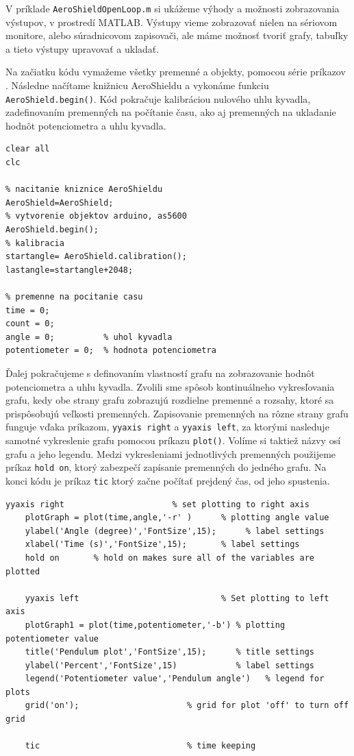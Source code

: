 V príklade \verb|AeroShieldOpenLoop.m| si ukážeme výhody a možnosti zobrazovania výstupov, v prostredí MATLAB. Výstupy vieme zobrazovať nielen na sériovom monitore, alebo súradnicovom zapisovači, ale máme možnosť tvoriť grafy, tabuľky a tieto výstupy upravovať a ukladať. 

Na začiatku kódu vymažeme všetky premenné a objekty, pomocou série príkazov . Následne načítame knižnicu AeroShieldu a vykonáme funkciu \verb|AeroShield.begin()|. Kód pokračuje kalibráciou nulového uhlu kyvadla, zadefinovaním premenných na počítanie času, ako aj premenných na ukladanie hodnôt potenciometra a uhlu kyvadla. 

\begin{lstlisting}[caption={AeroShield open loop inicializacia.},captionpos=b]
% vymazanie premennych a objektov 
clear all
clc 

% nacitanie kniznice AeroShieldu  
AeroShield=AeroShield;
% vytvorenie objektov arduino, as5600
AeroShield.begin();
% kalibracia
startangle= AeroShield.calibration(); 
lastangle=startangle+2048; 

% premenne na pocitanie casu
time = 0;
count = 0;
angle = 0;          % uhol kyvadla
potentiometer = 0;  % hodnota potenciometra
\end{lstlisting}

Ďalej pokračujeme s definovaním vlastností grafu na zobrazovanie hodnôt potenciometra a uhlu kyvadla. Zvolili sme spôsob kontinuálneho vykresľovania grafu, kedy obe strany grafu zobrazujú rozdielne premenné a rozsahy, ktoré sa prispôsobujú veľkosti premenných. Zapisovanie premenných na rôzne strany grafu funguje vďaka príkazom, \verb|yyaxis right| a \verb|yyaxis left|, za ktorými nasleduje samotné vykreslenie grafu pomocou príkazu \verb|plot()|. Volíme si taktiež názvy osí grafu a jeho legendu. Medzi vykresleniami jednotlivých premenných použijeme príkaz \verb|hold on|, ktorý zabezpečí zapísanie premenných do jedného grafu. Na konci kódu je príkaz \verb|tic| ktorý začne počítať prejdený čas, od jeho spustenia. 

\begin{lstlisting}[caption={AeroShield open loop grafy.},captionpos=b]
	yyaxis right                      % set plotting to right axis 
	plotGraph = plot(time,angle,'-r' )      % plotting angle value
	ylabel('Angle (degree)','FontSize',15);      % label settings
	xlabel('Time (s)','FontSize',15);       % label settings
	hold on       % hold on makes sure all of the variables are plotted
	
	yyaxis left                             % Set plotting to left axis
	plotGraph1 = plot(time,potentiometer,'-b') % plotting potentiometer value
	title('Pendulum plot','FontSize',15);      % title settings   
	ylabel('Percent','FontSize',15)            % label settings
	legend('Potentiometer value','Pendulum angle')   % legend for plots
	grid('on');                      % grid for plot 'off' to turn off grid
	
	tic                              % time keeping
\end{lstlisting}

